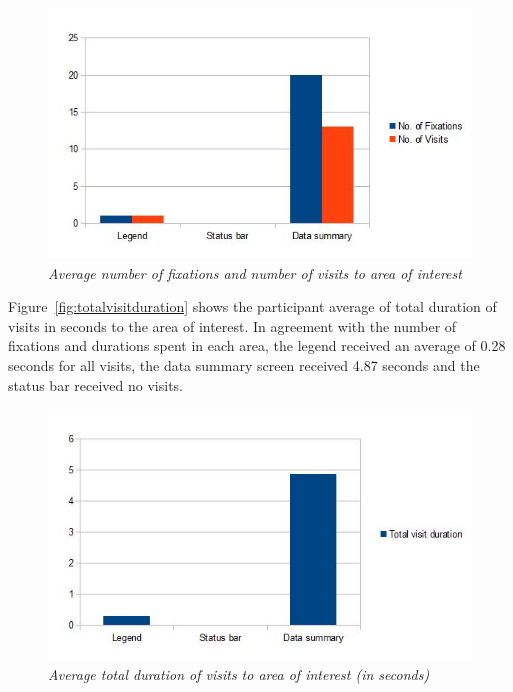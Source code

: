\begin{figure}[!htb]
	\centering
	\includegraphics[scale=0.70]{noofvisits.jpg}
	\caption{\textit{Average number of fixations and number of visits to area of interest}}
	\label{fig:noofvisits}
\end{figure}

Figure~\vref{fig:totalvisitduration} shows the participant average of total duration of visits in seconds to the area of interest. In agreement with the number of fixations and durations spent in each area, the legend received an average of 0.28 seconds for all visits, the data summary screen received 4.87 seconds and the status bar received no visits. 

\begin{figure}[!htb]
	\centering
	\includegraphics[scale=0.70]{totalvisitduration.jpg}
	\caption{\textit{Average total duration of visits to area of interest (in seconds)}}
	\label{fig:totalvisitduration}
\end{figure}

